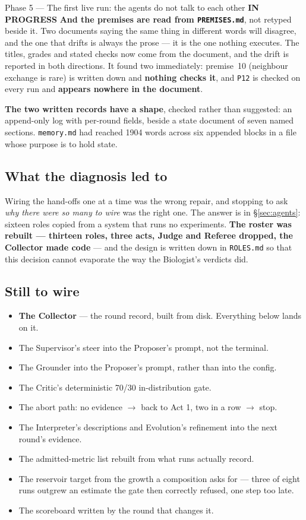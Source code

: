 \documentclass[11pt,a4paper]{article}
\newcommand{\code}[1]{\texttt{#1}}
\newcommand{\prog}{\textcolor{warn}{\textbf{IN PROGRESS}}}
\begin{document}
\begin{phasebox}{Phase 5 --- The first live run: the agents do not talk to each other \hfill \prog}
\textbf{And the premises are read from \code{PREMISES.md}}, not retyped beside it. Two documents
saying the same thing in different words will disagree, and the one that drifts is always the prose
--- it is the one nothing executes. The titles, grades and stated checks now come from the
document, and the drift is reported in both directions. It found two immediately: premise~10
(neighbour exchange is rare) is written down and \textbf{nothing checks it}, and \code{P12} is
checked on every run and \textbf{appears nowhere in the document}.

\textbf{The two written records have a shape}, checked rather than suggested: an append-only log
with per-round fields, beside a state document of seven named sections. \code{memory.md} had
reached 1904 words across six appended blocks in a file whose purpose is to hold state.

\subsection*{What the diagnosis led to}

Wiring the hand-offs one at a time was the wrong repair, and stopping to ask \emph{why there were
so many to wire} was the right one. The answer is in \S\ref{sec:agents}: sixteen roles copied from
a system that runs no experiments. \textbf{The roster was rebuilt --- thirteen roles, three acts,
Judge and Referee dropped, the Collector made code} --- and the design is written down in
\code{ROLES.md} so that this decision cannot evaporate the way the Biologist's verdicts did.

\subsection*{Still to wire}
\begin{itemize}[itemsep=1pt]
\item \textbf{The Collector} --- the round record, built from disk. Everything below lands on it.
\item The Supervisor's steer into the Proposer's prompt, not the terminal.
\item The Grounder into the Proposer's prompt, rather than into the config.
\item The Critic's deterministic 70/30 in-distribution gate.
\item The abort path: no evidence $\rightarrow$ back to Act 1, two in a row $\rightarrow$ stop.
\item The Interpreter's descriptions and Evolution's refinement into the next round's evidence.
\item The admitted-metric list rebuilt from what runs actually record.
\item The reservoir target from the growth a composition asks for --- three of eight runs
outgrew an estimate the gate then correctly refused, one step too late.
\item The scoreboard written by the round that changes it.
\end{itemize}
\end{phasebox}
\end{document}
